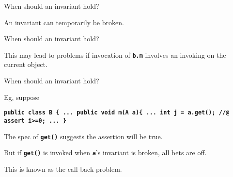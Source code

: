\documentclass[
pdf,
nocolorBG,
slideColor,
erik,
]{prosper}
\newcommand{\code}[1]{{\rm \texttt{\textbf{\small #1}}}}
\newcommand{\result}     {\(\backslash\)result}
\newcommand{\bsl}{\char'134}
\renewcommand{\result}{\bsl result}
\begin{document}
\begin{slide}{When should an invariant hold?}
\vspace*{-3ex}



An invariant can temporarily be broken.

\end{slide}

\begin{slide}{When should an invariant hold?}
\vspace*{-3ex}


This may lead to problems if invocation of \code{b.m}
involves an invoking on the current object.

\end{slide}

\begin{slide}{When should an invariant hold?}
\vspace*{-3ex}

Eg, suppose

\begin{alltt}\code{\scriptsize public class B \{
 ...
   public void m(A a)\{ 
    ... 
    int j = a.get(); //@ assert i>=0;
    ...
   \}}
\end{alltt} %

The spec of \code{get()} suggests the assertion will be true.

\medskip

But if \code{get()} is invoked when \code{a}'s invariant is broken, all bets are off.

\medskip

This is known as the {\red call-back} problem.

\end{slide}
\end{document}

